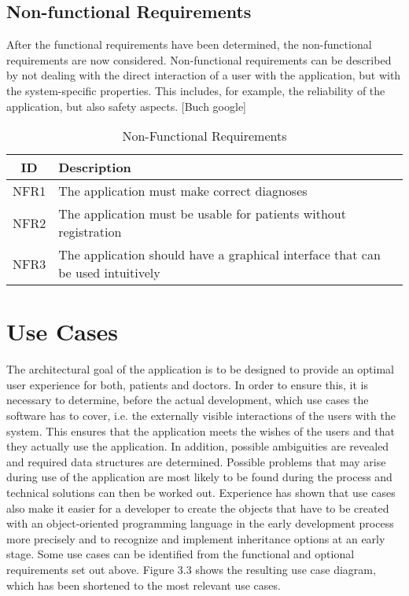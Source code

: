 \subsection{Non-functional Requirements}
After the functional requirements have been determined, the non-functional requirements are now considered. Non-functional requirements can be described by not dealing with the direct interaction of a user with the application, but with the system-specific properties. This includes, for example, the reliability of the application, but also safety aspects. [Buch google]
\begin{table}[H]
	\begin{center}
		\scriptsize
		\def\arraystretch{2}%
		\begin{tabular}{ c|l }
			\hline
			\textbf{ID} & \textbf{Description}  \\
			\hline
			NFR1 & The application must make correct diagnoses  \\
			\hline
			NFR2 & The application must be usable for patients without registration  \\
			\hline
			NFR3 & The application should have a graphical interface that can be used intuitively  \\
			\hline	
		\end{tabular}
		\normalsize
	\end{center}
	\caption{Non-Functional Requirements}
\end{table}


\section{Use Cases}
The architectural goal of the application is to be designed to provide an optimal user experience for both, patients and doctors. In order to ensure this, it is necessary to determine, before the actual development, which use cases the software has to cover, i.e. the externally visible interactions of the users with the system. This ensures that the application meets the wishes of the users and that they actually use the application. In addition, possible ambiguities are revealed and required data structures are determined. Possible problems that may arise during use of the application are most likely to be found during the process and technical solutions can then be worked out. Experience has shown that use cases also make it easier for a developer to create the objects that have to be created with an object-oriented programming language in the early development process more precisely and to recognize and implement inheritance options at an early stage. Some use cases can be identified from the functional and optional requirements set out above. Figure 3.3 shows the resulting use case diagram, which has been shortened to the most relevant use cases. 

